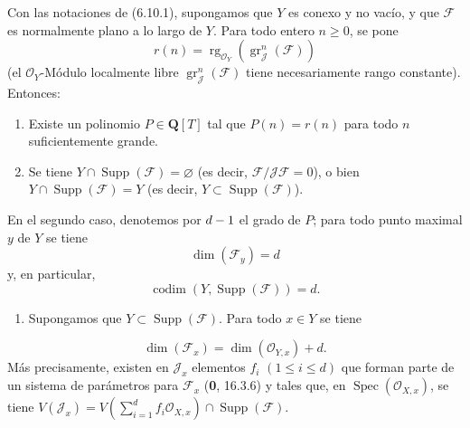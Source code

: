 \begin{proposition}[6.10.5]
\label{IV.2.s6.10.5-fr}
Con las notaciones de \textup{(6.10.1)}, supongamos que $Y$ es conexo y no
vacío, y que $\mathcal F$ es normalmente plano a lo largo de $Y$. Para todo
entero $n\geq0$, se pone
\begin{equation}
r(n)=\operatorname{rg}_{\mathcal O_Y}
(\operatorname{gr}_{\mathcal J}^{n}(\mathcal F))
\tag{6.10.5.1}\label{IV.2.s6.10.5.1-fr}
\end{equation}
(el $\mathcal O_Y$-Módulo localmente libre
$\operatorname{gr}_{\mathcal J}^{n}(\mathcal F)$ tiene necesariamente rango
constante). Entonces:
\begin{enumerate}
\item[\textup{(i)}] Existe un polinomio $P\in\mathbf Q[T]$ tal que $P(n)=r(n)$ para
todo $n$ suficientemente grande.
\item[\textup{(ii)}] Se tiene $Y\cap\operatorname{Supp}(\mathcal F)=\varnothing$
(es decir, $\mathcal F/\mathcal J\mathcal F=0$), o bien
$Y\cap\operatorname{Supp}(\mathcal F)=Y$ (es decir,
$Y\subset\operatorname{Supp}(\mathcal F)$).
\end{enumerate}
En el segundo caso, denotemos por $d- 1$ el grado de $P$; para todo punto maximal $y$
de $Y$ se tiene
\begin{equation}
\dim(\mathcal F_y)=d
\tag{6.10.5.2}\label{IV.2.s6.10.5.2-fr}
\end{equation}
y, en particular,
\begin{equation}
\operatorname{codim}(Y,\operatorname{Supp}(\mathcal F))=d.
\tag{6.10.5.3}\label{IV.2.s6.10.5.3-fr}
\end{equation}
\begin{enumerate}
\item[\textup{(iii)}] Supongamos que $Y\subset\operatorname{Supp}(\mathcal F)$. Para todo
$x\in Y$ se tiene
\end{enumerate}
\begin{equation}
\dim(\mathcal F_x)=\dim(\mathcal O_{Y,x})+d.
\tag{6.10.5.4}\label{IV.2.s6.10.5.4-fr}
\end{equation}
Más precisamente, existen en $\mathcal J_x$ elementos $f_i$
$(1\leq i\leq d)$ que forman parte de un sistema de parámetros para
$\mathcal F_x$ \textup{(\textbf{0}, 16.3.6)} y tales que, en
$\operatorname{Spec}(\mathcal O_{X,x})$, se tiene
$V(\mathcal J_x)=V(\sum_{i=1}^{d}f_i\mathcal O_{X,x})\cap\operatorname{Supp}(\mathcal F)$.
\end{proposition}

